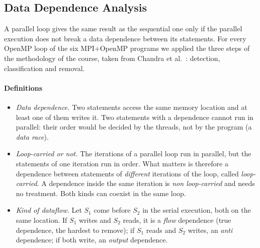 \documentclass[conference,onecolumn]{IEEEtran}
\begin{document}
\subsection{Data Dependence Analysis}\label{sec:deps}
A parallel loop gives the same result as the sequential one only if the parallel execution does not break a data dependence between its statements. For every OpenMP loop of the six MPI+OpenMP programs we applied the three steps of the methodology of the course, taken from Chandra et al.~\cite{chandra}: detection, classification and removal.

\paragraph{Definitions}
\begin{itemize}
\item \emph{Data dependence.} Two statements access the same memory location and at least one of them writes it. Two statements with a dependence cannot run in parallel: their order would be decided by the threads, not by the program (a \emph{data race}).
\item \emph{Loop-carried or not.} The iterations of a parallel loop run in parallel, but the statements of one iteration run in order. What matters is therefore a dependence between statements of \emph{different} iterations of the loop, called \emph{loop-carried}. A dependence inside the same iteration is \emph{non loop-carried} and needs no treatment. Both kinds can coexist in the same loop.
\item \emph{Kind of dataflow.} Let $S_1$ come before $S_2$ in the serial execution, both on the same location. If $S_1$ writes and $S_2$ reads, it is a \emph{flow} dependence (true dependence, the hardest to remove); if $S_1$ reads and $S_2$ writes, an \emph{anti} dependence; if both write, an \emph{output} dependence.
\end{itemize}
\end{document}
